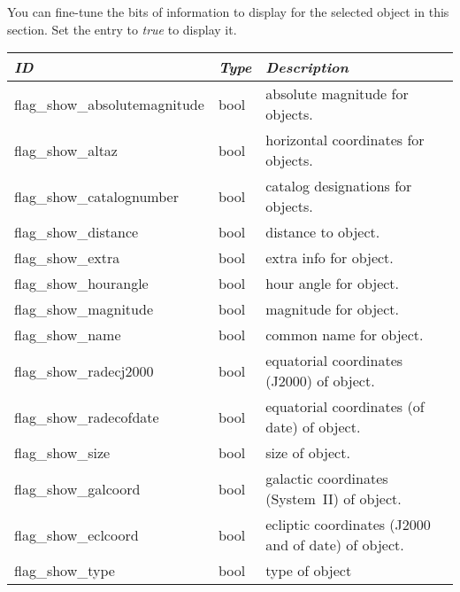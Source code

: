 \section{}
\label{sec:config.ini:custom_selected_info}

You can fine-tune the bits of information to display for the selected object in this section. Set the entry to \emph{true} to display it.

\begin{longtabu} to \textwidth {l|l|X}
\toprule
\emph{ID} & \emph{Type} & \emph{Description}\\
\midrule
flag\_show\_absolutemagnitude & bool & absolute magnitude for objects.\\
\midrule
flag\_show\_altaz & bool & horizontal coordinates for objects.\\
\midrule
flag\_show\_catalognumber & bool & catalog designations for objects.\\
\midrule
flag\_show\_distance & bool & distance to object.\\
\midrule
flag\_show\_extra & bool & extra info for object.\\
\midrule
flag\_show\_hourangle & bool & hour angle for object.\\
\midrule
flag\_show\_magnitude & bool & magnitude for object.\\
\midrule
flag\_show\_name & bool & common name for object.\\
\midrule
flag\_show\_radecj2000 & bool & equatorial coordinates (J2000) of object.\\
\midrule
flag\_show\_radecofdate & bool & equatorial coordinates (of date) of object.\\
\midrule
flag\_show\_size & bool & size of object.\\
\midrule
flag\_show\_galcoord & bool & galactic coordinates (System~II) of object.\\
\midrule
flag\_show\_eclcoord & bool & ecliptic coordinates (J2000 and of date) of object.\\
\midrule
flag\_show\_type & bool & type of object\\
\bottomrule
\end{longtabu}


\section{}
\label{sec:config.ini:custom_time_correction}

